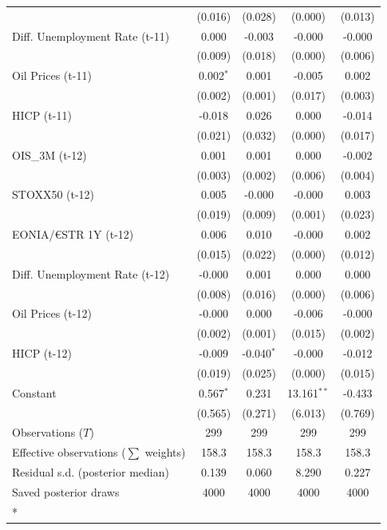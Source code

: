 \begin{longtable}[t]{lcccc}
 & (0.016) & (0.028) & (0.000) & (0.013)\\
Diff. Unemployment Rate (t-11) & 0.000 & -0.003 & -0.000 & -0.000\\
 & (0.009) & (0.018) & (0.000) & (0.006)\\
Oil Prices (t-11) & 0.002$^{*}$ & 0.001 & -0.005 & 0.002\\
 & (0.002) & (0.001) & (0.017) & (0.003)\\
HICP (t-11) & -0.018 & 0.026 & 0.000 & -0.014\\
 & (0.021) & (0.032) & (0.000) & (0.017)\\
OIS\_3M (t-12) & 0.001 & 0.001 & 0.000 & -0.002\\
 & (0.003) & (0.002) & (0.006) & (0.004)\\
STOXX50 (t-12) & 0.005 & -0.000 & -0.000 & 0.003\\
 & (0.019) & (0.009) & (0.001) & (0.023)\\
EONIA/€STR 1Y (t-12) & 0.006 & 0.010 & -0.000 & 0.002\\
 & (0.015) & (0.022) & (0.000) & (0.012)\\
Diff. Unemployment Rate (t-12) & -0.000 & 0.001 & 0.000 & 0.000\\
 & (0.008) & (0.016) & (0.000) & (0.006)\\
Oil Prices (t-12) & -0.000 & 0.000 & -0.006 & -0.000\\
 & (0.002) & (0.001) & (0.015) & (0.002)\\
HICP (t-12) & -0.009 & -0.040$^{*}$ & -0.000 & -0.012\\
 & (0.019) & (0.025) & (0.000) & (0.015)\\
Constant & 0.567$^{*}$ & 0.231 & 13.161$^{**}$ & -0.433\\
 & (0.565) & (0.271) & (6.013) & (0.769)\\
\midrule
Observations ($T$) & 299 & 299 & 299 & 299\\
Effective observations ($\sum$ weights) & 158.3 & 158.3 & 158.3 & 158.3\\
Residual s.d. (posterior median) & 0.139 & 0.060 & 8.290 & 0.227\\
Saved posterior draws & 4000 & 4000 & 4000 & 4000\\*
\end{longtable}
\endgroup{}

